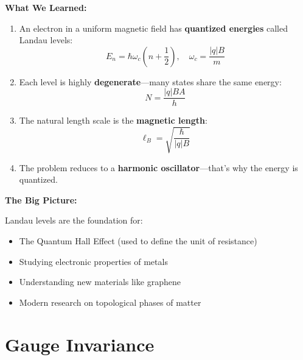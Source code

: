 \documentclass[11pt,a4paper]{article}
\let\oldsection\section
\renewcommand{\section}{\needspace{5\baselineskip}\oldsection}
\theoremstyle{definition}
\theoremstyle{remark}
\begin{document}
\begin{keyresult}
\textbf{What We Learned:}

\begin{enumerate}
    \item An electron in a uniform magnetic field has \textbf{quantized energies} called Landau levels:
    \begin{equation}
        E_n = \hbar\omega_c\left(n + \frac{1}{2}\right), \quad \omega_c = \frac{|q|B}{m}
    \end{equation}
    
    \item Each level is highly \textbf{degenerate}---many states share the same energy:
    \begin{equation}
        N = \frac{|q|BA}{h}
    \end{equation}
    
    \item The natural length scale is the \textbf{magnetic length}:
    \begin{equation}
        \ell_B = \sqrt{\frac{\hbar}{|q|B}}
    \end{equation}
    
    \item The problem reduces to a \textbf{harmonic oscillator}---that's why the energy is quantized.
\end{enumerate}
\end{keyresult}

\begin{insight}
\textbf{The Big Picture:}

Landau levels are the foundation for:
\begin{itemize}
    \item The Quantum Hall Effect (used to define the unit of resistance)
    \item Studying electronic properties of metals
    \item Understanding new materials like graphene
    \item Modern research on topological phases of matter
\end{itemize}
\end{insight}

\appendix
\section{Gauge Invariance}
\end{document}
